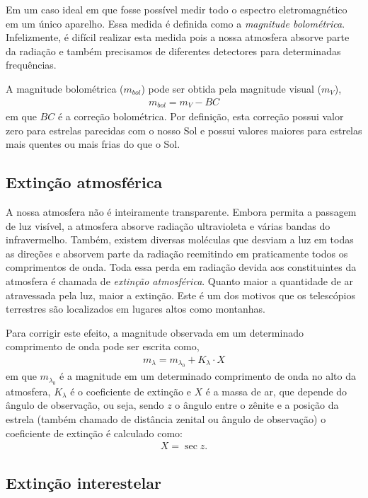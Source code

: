 Em um caso ideal em que fosse possível medir todo o espectro eletromagnético em um único aparelho. Essa medida é definida como a \textit{magnitude bolométrica}. Infelizmente, é difícil realizar esta medida pois a nossa atmosfera absorve parte da radiação e também precisamos de diferentes detectores para determinadas frequências.

A magnitude bolométrica ($m_{\si{bol}}$) pode ser obtida pela magnitude visual ($m_V$),
\begin{align}
m_{\si{bol}} = m_V - BC
\end{align}
em que $BC$ é a correção bolométrica. Por definição, esta correção possui valor zero para estrelas parecidas com o nosso Sol e possui valores maiores para estrelas mais quentes ou mais frias do que o Sol.

\subsection{Extinção atmosférica}

A nossa atmosfera não é inteiramente transparente. Embora permita a passagem de luz visível, a atmosfera absorve radiação ultravioleta e várias bandas do infravermelho. Também, existem diversas moléculas que desviam a luz em todas as direções e absorvem parte da radiação reemitindo em praticamente todos os comprimentos de onda. Toda essa perda em radiação devida aos constituintes da atmosfera é chamada de \textit{extinção atmosférica}. Quanto maior a quantidade de ar atravessada pela luz, maior a extinção. Este é um dos motivos que os telescópios terrestres são localizados em lugares altos como montanhas.

Para corrigir este efeito, a magnitude observada em um determinado comprimento de onda pode ser escrita como,
\begin{align}
m_{\lambda} = m_{\lambda_0} + K_{\lambda} \cdot X
\end{align}
em que $m_{\lambda_0}$ é a magnitude em um determinado comprimento de onda no alto da atmosfera, $K_{\lambda}$ é o coeficiente de extinção e $X$ é a massa de ar, que depende do ângulo de observação, ou seja, sendo $z$ o ângulo entre o zênite e a posição da estrela (também chamado de distância zenital ou ângulo de observação) o coeficiente de extinção é calculado como:
\begin{align}
X = \sec z .
\end{align}

\subsection{Extinção interestelar}

